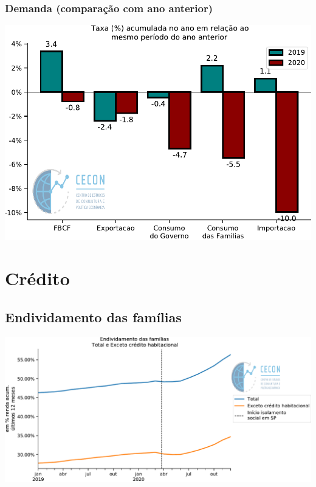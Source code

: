 \documentclass{SelfArx}
\begin{document}
\subsubsection*{Demanda (comparação com ano anterior)}
\label{sec:org98b9da3}

\begin{center}
\includegraphics[width=.9\linewidth]{./figs/PIB/Demanda_Acum_Comparativo.pdf}
\end{center}

\section*{Crédito}
\label{sec:org0d279ee}

\subsection*{Endividamento das famílias}
\label{sec:org2c54cda}

\begin{center}
\includegraphics[width=.9\linewidth]{./figs/Credito/EndividamentoFamilias.pdf}
\end{center}
\end{document}
